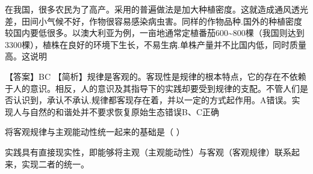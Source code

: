 \question 在我国，很多农民为了高产。采用的普遍做法是加大种植密度。这就造成通风透光差，田间小气候不好，作物很容易感染病虫害。同样的作物品种.国外的种植密度较国内要低很多。以澳大利亚为例，一亩地通常定植番茄600\textasciitilde{}800棵（我国则达到3300棵），植株在良好的环境下生长，不易生病.单株产量并不比国内低，同时质量高。这说明
\par{}
\begin{solution}【答案】BC
【简析】规律是客观的。客现性是规律的根本特点，它的存在不依赖于人的意识。相反，人的意识及其指导下的实践却要受到规律的支配。不管人们是否认识到，承认不承认.规律都客现存在着，并以一定的方式起作用。A错误。实现人与自然的和谐处并不要求恢复原始生态错误B、C正确
\end{solution}
\question 将客观规律与主观能动性统一起来的基础是（ ）
\par{}
\begin{solution}实践具有直接现实性，即能够将主观（主观能动性）与客观（客观规律）联系起来，实现二者的统一。
\end{solution}
